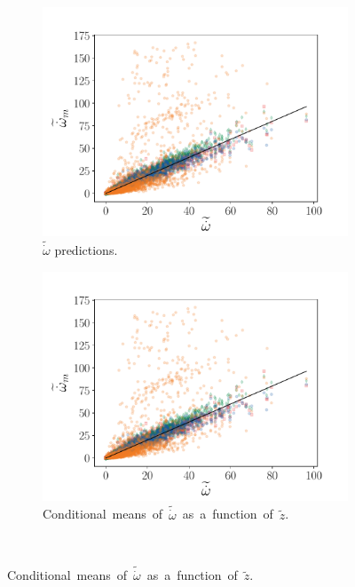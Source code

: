\documentclass[review]{elsarticle}
\newcommand{\wt}[1]{\widetilde{#1}}
\begin{document}
\begin{figure}[!tbp]%
  \centering%
  \begin{subfigure}[t]{0.48\textwidth}%
    \includegraphics[page=1,width=\textwidth, trim=0.5cm 0cm 1.3cm 1.3cm, clip=true]{./figs/convolution_skip.pdf}%
    \caption{$\wt{\dot{\omega}}$ predictions.}%
  \end{subfigure}\hfill%
  \begin{subfigure}[t]{0.48\textwidth}%
    \includegraphics[page=3,width=\textwidth, trim=0.5cm 0cm 1.5cm 1.3cm, clip=true]{./figs/convolution_skip.pdf}%
    \caption{\mbox{Conditional means of $\wt{\dot{\omega}}$ as a function of $\wt{z}$.}}%
  \end{subfigure}\\[0.2cm]%

\end{figure}
\end{document}
